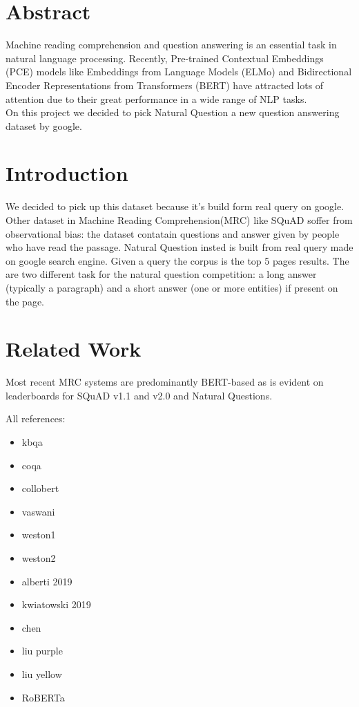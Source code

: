 \documentclass[12pt,a4paper,hidelinks]{article}
\begin{document}

\tableofcontents
\thispagestyle{empty}
\newpage
\setcounter{page}{1}

\section{Abstract}\label{sec:abstaract}
Machine reading comprehension and question answering is an essential task in
natural language processing. Recently, Pre-trained Contextual Embeddings (PCE)
models like Embeddings from Language Models (ELMo) \cite{elmo} and Bidirectional
Encoder Representations from Transformers (BERT) \cite{bert} have attracted lots of attention due to their great performance in a wide range of NLP tasks. \\
On this project we decided to pick Natural Question\cite{nq} a new question answering dataset by google.  
\section{Introduction}\label{sec:intro}
We decided to pick up this dataset because it's build form real query on google.
Other dataset in Machine Reading Comprehension(MRC) like SQuAD\cite{squad_2} soffer from observational bias: the dataset contatain questions and answer given by people who have read the passage. Natural Question insted is built from real query made on google search engine. Given a query the corpus is the top 5 pages results. The are two different task for the natural question competition: a long answer (typically a paragraph) and a short answer (one or more entities) if present on the page.   \\
\section{Related Work}
Most recent MRC systems are predominantly BERT-based
as is evident on leaderboards for SQuAD v1.1 and v2.0 and Natural Questions.

All references:
\begin{itemize}
  \item kbqa~\cite{kbqa}    
  \item coqa~\cite{coqa}
  \item collobert~\cite{Collobert}
  \item vaswani~\cite{vaswani}
  \item weston1~\cite{weston-tracking}
  \item weston2~\cite{weston-reading}
  \item alberti 2019~\cite{alberti}
  \item kwiatowski 2019~\cite{kwiatowski}
  \item chen~\cite{chen}
  \item liu purple~\cite{liu-purple}
  \item liu yellow~\cite{liu-yellow}
  \item RoBERTa~\cite{roberta}
\end{itemize}
\end{document}
